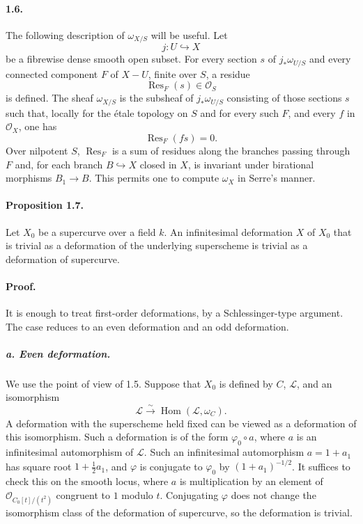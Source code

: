 \documentclass[11pt]{article}
\newcommand{\cO}{\mathcal O}
\newcommand{\cL}{\mathcal L}
\newcommand{\Hom}{\operatorname{Hom}}
\newcommand{\Res}{\operatorname{Res}}
\begin{document}
\paragraph{1.6.}
The following description of $\omega_{X/S}$ will be useful. Let
\[
  j:U\hookrightarrow X
\]
be a fibrewise dense smooth open subset. For every section $s$ of $j_*\omega_{U/S}$ and every connected component $F$ of $X-U$, finite over $S$, a residue
\[
  \Res_F(s)\in\cO_S
\]
is defined. The sheaf $\omega_{X/S}$ is the subsheaf of $j_*\omega_{U/S}$ consisting of those sections $s$ such that, locally for the étale topology on $S$ and for every such $F$, and every $f$ in $\cO_X$, one has
\[
  \Res_F(fs)=0.
\]
Over nilpotent $S$, $\Res_F$ is a sum of residues along the branches passing through $F$ and, for each branch $B\hookrightarrow X$ closed in $X$, is invariant under birational morphisms $B_1\to B$. This permits one to compute $\omega_X$ in Serre's manner.

\paragraph{Proposition 1.7.}
Let $X_0$ be a supercurve over a field $k$. An infinitesimal deformation $X$ of $X_0$ that is trivial as a deformation of the underlying superscheme is trivial as a deformation of supercurve.

\paragraph{Proof.}
It is enough to treat first-order deformations, by a Schlessinger-type argument. The case reduces to an even deformation and an odd deformation.

\subparagraph{a. Even deformation.}
We use the point of view of 1.5. Suppose that $X_0$ is defined by $C$, $\cL$, and an isomorphism
\[
  \cL\xrightarrow{\sim}\Hom(\cL,\omega_C).
\]
A deformation with the superscheme held fixed can be viewed as a deformation of this isomorphism. Such a deformation is of the form $\varphi_0\circ a$, where $a$ is an infinitesimal automorphism of $\cL$. Such an infinitesimal automorphism $a=1+a_1$ has square root $1+\frac12a_1$, and $\varphi$ is conjugate to $\varphi_0$ by $(1+a_1)^{-1/2}$. It suffices to check this on the smooth locus, where $a$ is multiplication by an element of $\cO_{C_0[t]/(t^2)}$ congruent to $1$ modulo $t$. Conjugating $\varphi$ does not change the isomorphism class of the deformation of supercurve, so the deformation is trivial.
\end{document}
